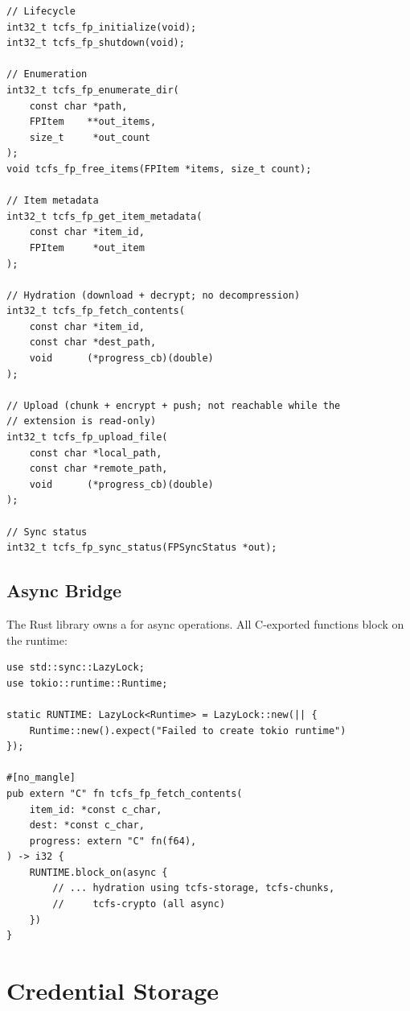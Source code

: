 \documentclass[11pt,a4paper]{article}
\begin{document}
\begin{lstlisting}[language={},title={Exported C functions}]
// Lifecycle
int32_t tcfs_fp_initialize(void);
int32_t tcfs_fp_shutdown(void);

// Enumeration
int32_t tcfs_fp_enumerate_dir(
    const char *path,
    FPItem    **out_items,
    size_t     *out_count
);
void tcfs_fp_free_items(FPItem *items, size_t count);

// Item metadata
int32_t tcfs_fp_get_item_metadata(
    const char *item_id,
    FPItem     *out_item
);

// Hydration (download + decrypt; no decompression)
int32_t tcfs_fp_fetch_contents(
    const char *item_id,
    const char *dest_path,
    void      (*progress_cb)(double)
);

// Upload (chunk + encrypt + push; not reachable while the
// extension is read-only)
int32_t tcfs_fp_upload_file(
    const char *local_path,
    const char *remote_path,
    void      (*progress_cb)(double)
);

// Sync status
int32_t tcfs_fp_sync_status(FPSyncStatus *out);
\end{lstlisting}

\subsection{Async Bridge}

The Rust library owns a  for async operations. All
C-exported functions block on the runtime:

\begin{lstlisting}[language={},title={Async bridge pattern}]
use std::sync::LazyLock;
use tokio::runtime::Runtime;

static RUNTIME: LazyLock<Runtime> = LazyLock::new(|| {
    Runtime::new().expect("Failed to create tokio runtime")
});

#[no_mangle]
pub extern "C" fn tcfs_fp_fetch_contents(
    item_id: *const c_char,
    dest: *const c_char,
    progress: extern "C" fn(f64),
) -> i32 {
    RUNTIME.block_on(async {
        // ... hydration using tcfs-storage, tcfs-chunks,
        //     tcfs-crypto (all async)
    })
}
\end{lstlisting}

\section{Credential Storage}
\end{document}
